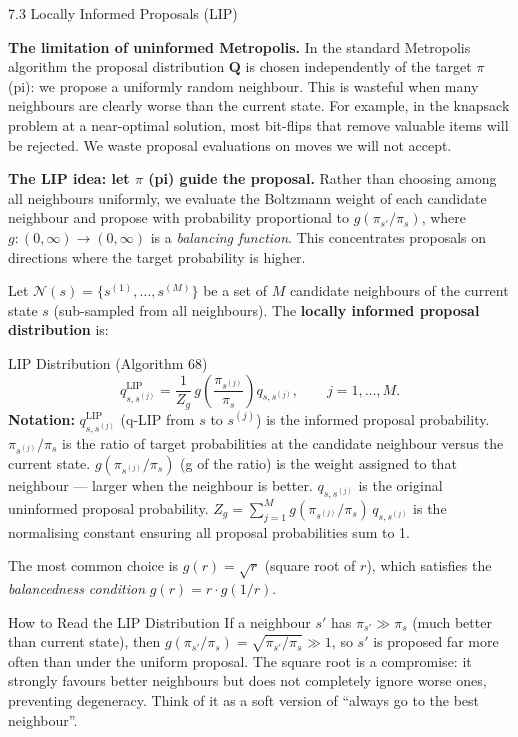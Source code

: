 \documentclass[aspectratio=169,10pt]{beamer}
\newcommand{\calN}{\mathcal{N}}
\begin{document}
\begin{frame}[allowframebreaks]{7.3 Locally Informed Proposals (LIP)}

\textbf{The limitation of uninformed Metropolis.}
In the standard Metropolis algorithm the proposal distribution $\mathbf{Q}$
is chosen independently of the target $\pi$ (pi): we propose a uniformly
random neighbour.  This is wasteful when many neighbours are clearly worse
than the current state.  For example, in the knapsack problem at a
near-optimal solution, most bit-flips that remove valuable items will be
rejected.  We waste proposal evaluations on moves we will not accept.

\medskip
\textbf{The LIP idea: let $\pi$ (pi) guide the proposal.}
Rather than choosing among all neighbours uniformly, we evaluate the
Boltzmann weight of each candidate neighbour and propose with probability
proportional to $g(\pi_{s'}/\pi_s)$, where $g : (0,\infty) \to (0,\infty)$
is a \emph{balancing function}.  This concentrates proposals on directions
where the target probability is higher.

Let $\calN(s) = \{s^{(1)},\ldots,s^{(M)}\}$ be a set of $M$ candidate
neighbours of the current state $s$ (sub-sampled from all neighbours).  The
\textbf{locally informed proposal distribution} is:

\begin{block}{LIP Distribution (Algorithm 68)}
  \[
    q^{\mathrm{LIP}}_{s, s^{(j)}}
    = \frac{1}{Z_g}\,g\!\left(\frac{\pi_{s^{(j)}}}{\pi_s}\right) q_{s, s^{(j)}},
    \qquad j = 1,\ldots,M.
  \]
  \textbf{Notation:} $q^{\mathrm{LIP}}_{s, s^{(j)}}$ (q-LIP from $s$ to
  $s^{(j)}$) is the informed proposal probability.
  $\pi_{s^{(j)}}/\pi_s$ is the ratio of target probabilities at the
  candidate neighbour versus the current state.
  $g(\pi_{s^{(j)}}/\pi_s)$ (g of the ratio) is the weight assigned to that
  neighbour --- larger when the neighbour is better.
  $q_{s,s^{(j)}}$ is the original uninformed proposal probability.
  $Z_g = \sum_{j=1}^{M} g(\pi_{s^{(j)}}/\pi_s)\, q_{s,s^{(j)}}$ is the
  normalising constant ensuring all proposal probabilities sum to 1.
\end{block}

The most common choice is $g(r) = \sqrt{r}$ (square root of $r$), which
satisfies the \emph{balancedness condition} $g(r) = r \cdot g(1/r)$.

\begin{alertblock}{How to Read the LIP Distribution}
  If a neighbour $s'$ has $\pi_{s'} \gg \pi_s$ (much better than current
  state), then $g(\pi_{s'}/\pi_s) = \sqrt{\pi_{s'}/\pi_s} \gg 1$, so $s'$
  is proposed far more often than under the uniform proposal.  The square
  root is a compromise: it strongly favours better neighbours but does not
  completely ignore worse ones, preventing degeneracy.  Think of it as a
  soft version of ``always go to the best neighbour''.
\end{alertblock}


\end{frame}
\end{document}
